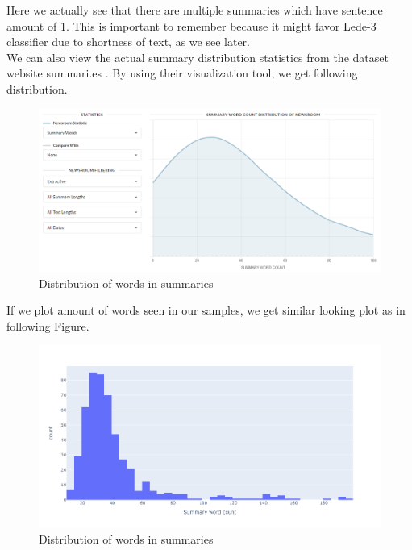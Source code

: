 \documentclass{article}
\begin{document}
\noindent
Here we actually see that there are multiple summaries which have sentence amount of 1. This is important to remember because it might favor Lede-3 classifier due to shortness of text, as we see later.\\

\noindent
We can also view the actual summary distribution statistics from the dataset website summari.es \cite{dataset}. By using their visualization tool, we get following distribution. \\

\noindent
\begin{figure}[H]
	\centering
	\hspace*{-3cm}
	\includegraphics[scale=0.55]{words_in_summary.png}
	\caption{Distribution of words in summaries}
	\label{fig:words_in_summary}
\end{figure}

\noindent
If we plot amount of words seen in our samples, we get similar looking plot as in following Figure.\\

\noindent
\begin{figure}[H]
	\centering
	\hspace*{-3cm}
	\includegraphics[scale=0.55]{empirical_summary_words.png}
	\caption{Distribution of words in summaries}
	\label{fig:empirical_summary_words}
\end{figure}
\end{document}
